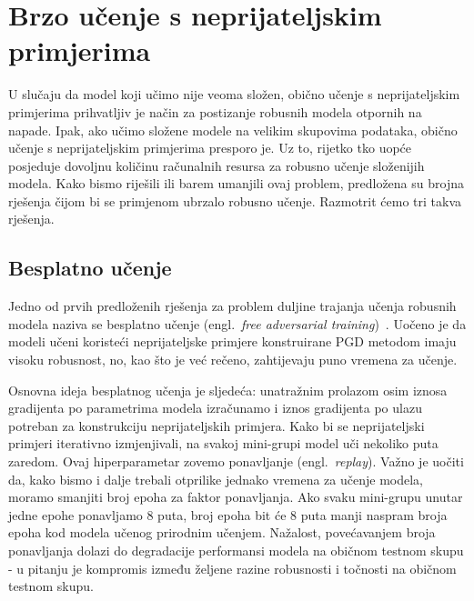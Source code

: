 \documentclass[times, utf8, zavrsni, numeric]{fer}
\begin{document}
\section{Brzo učenje s neprijateljskim primjerima}

U slučaju da model koji učimo nije veoma složen, obično učenje s neprijateljskim primjerima prihvatljiv je način za postizanje robusnih modela otpornih na napade.
Ipak, ako učimo složene modele na velikim skupovima podataka, obično učenje s neprijateljskim primjerima presporo je. 
Uz to, rijetko tko uopće posjeduje dovoljnu količinu računalnih resursa za robusno učenje složenijih modela.
Kako bismo riješili ili barem umanjili ovaj problem, predložena su brojna rješenja čijom bi se primjenom ubrzalo robusno učenje. Razmotrit ćemo tri takva rješenja.

\pagebreak

\subsection{Besplatno učenje}

Jedno od prvih predloženih rješenja za problem duljine trajanja učenja robusnih modela naziva se besplatno učenje (engl.\ \textit{free adversarial training})~\cite{shafahi2019adversarial}.
Uočeno je da modeli učeni koristeći neprijateljske primjere konstruirane PGD metodom imaju visoku robusnost, no, kao što je već rečeno, zahtijevaju puno vremena za učenje.

Osnovna ideja besplatnog učenja je sljedeća: unatražnim prolazom osim iznosa gradijenta po parametrima modela izračunamo i iznos gradijenta po ulazu potreban za konstrukciju neprijateljskih primjera.
Kako bi se neprijateljski primjeri iterativno izmjenjivali, na svakoj mini-grupi model uči nekoliko puta zaredom. Ovaj hiperparametar zovemo ponavljanje (engl.\ \textit{replay}).
Važno je uočiti da, kako bismo i dalje trebali otprilike jednako vremena za učenje modela, moramo smanjiti broj epoha za faktor ponavljanja. 
Ako svaku mini-grupu unutar jedne epohe ponavljamo 8 puta, broj epoha bit će 8 puta manji naspram broja epoha kod modela učenog prirodnim učenjem.
Nažalost, povećavanjem broja ponavljanja dolazi do degradacije performansi modela na običnom testnom skupu - u pitanju je kompromis između željene razine robusnosti i točnosti na običnom testnom skupu.
\end{document}
